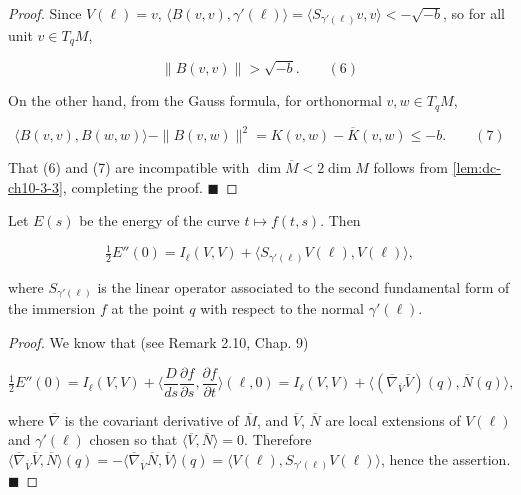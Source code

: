 \begin{proof}
  Since $V(\ell)=v$, $\langle B(v,v),\gamma'(\ell)\rangle=\langle S_{\gamma'(\ell)}v,v\rangle<-\sqrt{-b}$,
  so for all unit $v\in T_qM$,
  
  $$
  \|B(v,v)\|>\sqrt{-b}.\qquad(6)
  $$
  
  On the other hand, from the Gauss formula, for orthonormal $v,w\in T_qM$,
  
  $$
  \langle B(v,v),B(w,w)\rangle-\|B(v,w)\|^2=K(v,w)-\overline{K}(v,w)\leq -b.\qquad(7)
  $$
  
  That (6) and (7) are incompatible with $\dim\overline{M}<2\dim M$ follows from
  \cref{lem:dc-ch10-3-3}, completing the proof. $\blacksquare$
\end{proof}

\begin{lemma}[Lemma 3.2]
  \label{lem:dc-ch10-3-2}
  Let $E(s)$ be the energy of the curve $t\mapsto f(t,s)$. Then
  
  $$
  \tfrac{1}{2}E''(0)=I_\ell(V,V)+\langle S_{\gamma'(\ell)}V(\ell),V(\ell)\rangle,
  $$
  
  where $S_{\gamma'(\ell)}$ is the linear operator associated to the second
  fundamental form of the immersion $f$ at the point $q$ with respect to the normal
  $\gamma'(\ell)$.
\end{lemma}
\begin{proof}
  We know that (see Remark 2.10, Chap. 9)
  
  $$
  \tfrac{1}{2}E''(0)=I_\ell(V,V)+\Big\langle\frac{D}{ds}\frac{\partial f}{\partial s},\frac{\partial f}{\partial t}\Big\rangle(\ell,0)=I_\ell(V,V)+\langle(\overline{\nabla}_{\overline V}\overline V)(q),\overline N(q)\rangle,
  $$
  
  where $\overline\nabla$ is the covariant derivative of $\overline{M}$, and
  $\overline V$, $\overline N$ are local extensions of $V(\ell)$ and $\gamma'(\ell)$
  chosen so that $\langle\overline V,\overline N\rangle=0$. Therefore
  $\langle\overline\nabla_{\overline V}\overline V,\overline N\rangle(q)=-\langle\overline\nabla_{\overline V}\overline N,\overline V\rangle(q)=\langle V(\ell),S_{\gamma'(\ell)}V(\ell)\rangle$,
  hence the assertion. $\blacksquare$
\end{proof}

